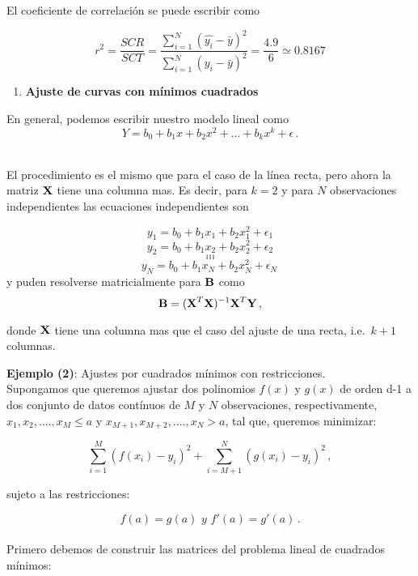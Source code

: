 \documentclass[
]{agujournal2019}
\providecommand{\tightlist}{%
  \setlength{\itemsep}{0pt}\setlength{\parskip}{0pt}}\usepackage{longtable,booktabs,array}
\begin{document}
El coeficiente de correlación se puede escribir como

\[r^2=\frac{SCR}{SCT}=\frac{\sum\limits^N_{i=1}(\hat{y_i}-\bar{y})^2}{\sum\limits^N_{i=1}
({y_i}-\bar{y})^2}=\frac{4.9}{6}\simeq0.8167\]

\vspace{0.5cm}

\begin{enumerate}
\def\labelenumi{(\arabic{enumi})}
\setcounter{enumi}{3}
\tightlist
\item
  \textbf{Ajuste de curvas con mínimos cuadrados} ~
\end{enumerate}

En general, podemos escribir nuestro modelo lineal como
\[Y=b_0 + b_1x + b_2 x^2 + ... + b_k x^k + \epsilon\,.\] ~

El procedimiento es el mismo que para el caso de la línea recta, pero
ahora la matriz \({\textbf X}\) tiene una columna mas. Es decir, para
\(k=2\) y para \(N\) observaciones independientes las ecuaciones
independientes son

\[y_1=b_0 + b_1x_1 + b_2 x_1^2 + \epsilon_1\]
\[y_2=b_0 + b_1x_2 + b_2 x_2^2 + \epsilon_2\] \[...\] \[...\] \[...\]
\[y_N=b_0 + b_1x_N + b_2 x_N^2 + \epsilon_N\,\] y puden resolverse
matricialmente para \({\textbf B}\) como
\[{\textbf B}=({\textbf X}^T{\textbf X})^{-1}{\textbf X}^T{\textbf Y}\,,\]

donde \({\textbf X}\) tiene una columna mas que el caso del ajuste de
una recta, i.e.~\(k+1\) columnas.

\vspace{0.5cm}

\textbf{Ejemplo (2)}: Ajustes por cuadrados mínimos con restricciones.\\

Supongamos que queremos ajustar dos polinomios \(f(x)\) y \(g(x)\) de
orden d-1 a dos conjunto de datos contínuos de \(M\) y \(N\)
observaciones, respectivamente, \(x_1, x_2, ....,x_M\leq a\) y
\(x_{M+1}, x_{M+2}, ....,x_N>a\), tal que, queremos minimizar:

\[\sum\limits^M_{i=1}(f(x_i)-y_i)^2 + \sum\limits^N_{i=M+1}(g(x_i)-y_i)^2\,,\]

sujeto a las restricciones:

\[f(a)=g(a)\,\,y\,\,f'(a)=g'(a)\,.\]\\

Primero debemos de construir las matrices del problema lineal de
cuadrados mínimos:
\end{document}
